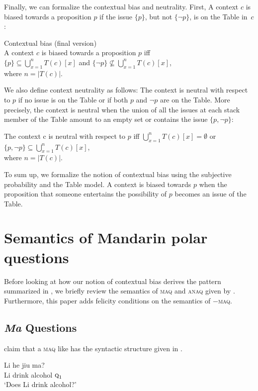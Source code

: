 \documentclass[output=paper,colorlinks,citecolor=brown]{langscibook}
\begin{document}
Finally, we can formalize the contextual bias and neutrality.  First, A context ${c}$ is biased towards a proposition $p$ if  the issue $\{p\}$, but not $\{\neg p\}$, is on the Table in~${c}$:

\ea\label{cbtable} Contextual bias (final version)\\
 A context ${c}$ is biased towards a proposition $p$ iff \\
 $\{p\}\subseteq\bigcup_{x=1}^{n}{T}({c})[x]$ and $\{\neg p\}\not\subseteq\bigcup_{x=1}^{n}{T}({c})[x]$,\\
 where $n=|T({c})|$.
\z

We also define context neutrality as follows: The context is neutral with respect to $p$ if no issue is on the Table or if both $p$ and $\neg p$ are on the Table.  More precisely, the context is neutral when the union of all the issues at each stack member of the Table amount to  an empty set  or contains the issue $\{p, \neg p\}$:

\ea The context {c} is neutral with respect to $p$ iff $\bigcup_{x=1}^{n}{T}({c})[x]  = \emptyset$ or $\{p, \neg p\}\subseteq\bigcup_{x=1}^{n}{T}({c})[x]$,\\
 where $n=|T({c})|$.
\z

To sum up, we formalize the notion of contextual bias using the subjective probability and the Table model.  A context is biased towards $p$ when the proposition that someone entertains the possibility of $p$ becomes an  issue of the Table.  


\section{Semantics of Mandarin polar questions}
Before looking at how our notion of contextual bias derives the pattern summarized in , we briefly review the semantics of  \textsc{maq} and \textsc{anaq} given by \citet{YuanHaraGlowinAsia2019}.  Furthermore, this paper adds felicity conditions on the semantics of $-$\textsc{maq}.


\subsection{\textit{Ma} Questions}

\citet{YuanHaraGlowinAsia2019} claim that a \textsc{maq} like  has the syntactic structure given in .


\ea\label{441} \gll Li he jiu ma?\\
Li drink alcohol $\textsc{q}_{1}$\\
\glt `Does Li drink alcohol?'
\z
\end{document}
